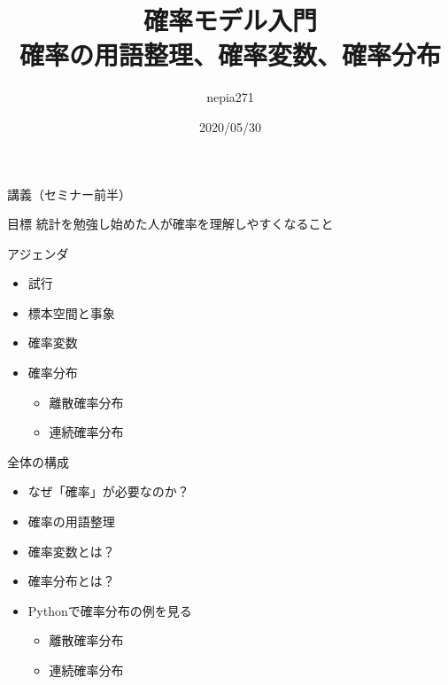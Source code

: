 \documentclass[dvipdfmx,cjk]{beamer}
\title{確率モデル入門\\確率の用語整理、確率変数、確率分布}
\author{nepia271}
\institute{Liberal Arts for Tech}
\date{2020/05/30}
\begin{document}
\begin{frame}
  \titlepage
\end{frame}




\begin{frame}{講義（セミナー前半）}

\begin{block}{目標}
    統計を勉強し始めた人が確率を理解しやすくなること
\end{block}

\vskip 1cm

\begin{block}{アジェンダ}
    \begin{itemize}
    \item 試行
    \item 標本空間と事象
    \item 確率変数
    \item 確率分布
        \begin{itemize}
        \item 離散確率分布
        \item 連続確率分布
        \end{itemize}
    \end{itemize}
\end{block}

\end{frame}


\begin{frame}{全体の構成}

\begin{itemize}
    \item なぜ「確率」が必要なのか？
    \item 確率の用語整理
    \item 確率変数とは？
    \item 確率分布とは？
    \item Pythonで確率分布の例を見る
        \begin{itemize}
        \item 離散確率分布
        \item 連続確率分布
        \end{itemize}
\end{itemize}

\end{frame}
\end{document}
